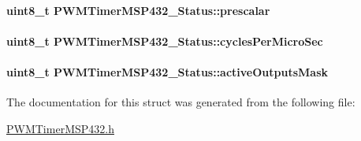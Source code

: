 \paragraph[{prescalar}]{\setlength{\rightskip}{0pt plus 5cm}uint8\+\_\+t P\+W\+M\+Timer\+M\+S\+P432\+\_\+\+Status\+::prescalar}\label{struct_p_w_m_timer_m_s_p432___status_a787549c1d11c925c5b47a0d949635a98}
\paragraph[{cycles\+Per\+Micro\+Sec}]{\setlength{\rightskip}{0pt plus 5cm}uint8\+\_\+t P\+W\+M\+Timer\+M\+S\+P432\+\_\+\+Status\+::cycles\+Per\+Micro\+Sec}\label{struct_p_w_m_timer_m_s_p432___status_a1f35280490cdb35c9544e19acd0bfec5}
\paragraph[{active\+Outputs\+Mask}]{\setlength{\rightskip}{0pt plus 5cm}uint8\+\_\+t P\+W\+M\+Timer\+M\+S\+P432\+\_\+\+Status\+::active\+Outputs\+Mask}\label{struct_p_w_m_timer_m_s_p432___status_a5ac617df3b2bf86ebfa46589c06bb3ea}


The documentation for this struct was generated from the following file\+:\begin{DoxyCompactItemize}
\item 
\hyperlink{_p_w_m_timer_m_s_p432_8h}{P\+W\+M\+Timer\+M\+S\+P432.\+h}\end{DoxyCompactItemize}
